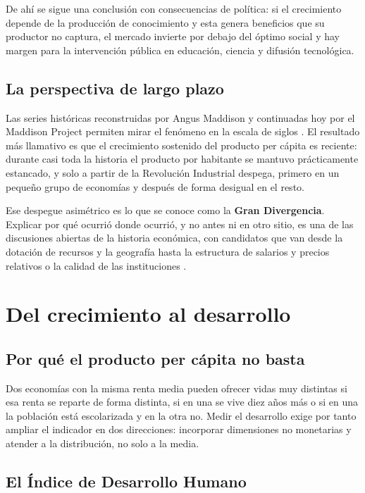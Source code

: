De ahí se sigue una conclusión con consecuencias de política: si el crecimiento
depende de la producción de conocimiento y esta genera beneficios que su
productor no captura, el mercado invierte por debajo del óptimo social y hay
margen para la intervención pública en educación, ciencia y difusión
tecnológica.

\subsection{La perspectiva de largo plazo}

Las series históricas reconstruidas por Angus Maddison y continuadas hoy por el
Maddison Project permiten mirar el fenómeno en la escala de siglos
\parencite{maddison2002,boltvanzanden2024}. El resultado más llamativo es que
el crecimiento sostenido del producto per cápita es reciente: durante casi toda
la historia el producto por habitante se mantuvo prácticamente estancado, y solo
a partir de la Revolución Industrial despega, primero en un pequeño grupo de
economías y después de forma desigual en el resto.

Ese despegue asimétrico es lo que se conoce como la \textbf{Gran Divergencia}.
Explicar por qué ocurrió donde ocurrió, y no antes ni en otro sitio, es una de
las discusiones abiertas de la historia económica, con candidatos que van desde
la dotación de recursos y la geografía hasta la estructura de salarios y precios
relativos o la calidad de las instituciones \parencite{allen2013}.

\section{Del crecimiento al desarrollo}

\subsection{Por qué el producto per cápita no basta}

Dos economías con la misma renta media pueden ofrecer vidas muy distintas si esa
renta se reparte de forma distinta, si en una se vive diez años más o si en una
la población está escolarizada y en la otra no. Medir el desarrollo exige por
tanto ampliar el indicador en dos direcciones: incorporar dimensiones no
monetarias y atender a la distribución, no solo a la media.

\subsection{El Índice de Desarrollo Humano}

